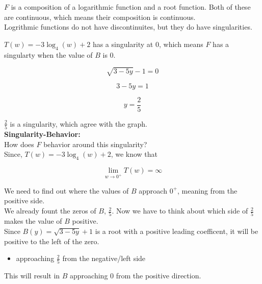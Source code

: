 \documentclass{ximera}
\begin{document}
$F$ is a composition of a logarithmic function and a root function.  Both of these are continuous, which means their composition is continuous. \\

Logrithmic functions do not have discontinuites, but they do have singularities.  


$T(w) = -3 \log_4(w) + 2$ has a singularity at $0$, which means $F$ has a singularty when the value of $B$ is $0$.



\[
\sqrt{3 - 5y} - 1 = 0
\]



\[
3 - 5y = 1
\]



\[
y = \frac{2}{5}
\]

$\frac{2}{5}$ is a singularity, which agree with the graph. \\












\textbf{\textcolor{blue!55!black}{Singularity-Behavior:}} \\

How does $F$ behavior around this singularity? \\



Since, $T(w) = -3 \log_4(w) + 2$, we know that 


\[
\lim\limits_{w \to 0^+} T(w) = \infty
\]



We need to find out where the values of $B$ approach $0^+$, meaning from the positive side. \\


We already fount the zeros of $B$, $\frac{2}{5}$.  Now we have to think about which side of $\frac{2}{5}$ makes the value of $B$ positive. \\


Since $B(y) = \sqrt{3 - 5y} + 1$ is a root with a positive leading coefficent, it will be positive to the left of the zero. 

\begin{itemize}
\item approaching $\frac{2}{5}$ from the negative/left side
\end{itemize}

This will result in $B$ approaching $0$ from the positive direction. \\
\end{document}
